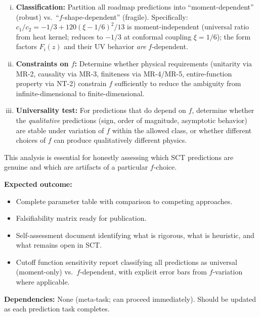 \documentclass[12pt,a4paper]{article}
\newcommand{\outcome}[1]{\noindent\textbf{Expected outcome:} #1\par}
\newcommand{\deps}[1]{\noindent\textbf{Dependencies:} #1\par}
\begin{document}
{\begin{enumerate}[(a)]
\begin{enumerate}[(i)]
        full shape of $f$? The heat-kernel expansion to $a_4$ (Einstein--Hilbert +
        SM Lagrangian) depends only on moments; the nonlocal form factors $F_1$,
        $F_2$ depend on the \emph{entire} function $f$ via the Laplace transform.
      \item \textbf{Classification:} Partition all roadmap predictions into
        ``moment-dependent'' (robust) vs.\ ``$f$-shape-dependent'' (fragile).
        Specifically: $c_1/c_2 = -1/3 + 120(\xi-1/6)^2/13$ is moment-independent
        (universal ratio from heat kernel; reduces to $-1/3$ at conformal coupling
        $\xi = 1/6$); the form factors $F_i(z)$ and their UV behavior
        \emph{are} $f$-dependent.
      \item \textbf{Constraints on $f$:} Determine whether physical requirements
        (unitarity via MR-2, causality via MR-3, finiteness via MR-4/MR-5,
        entire-function property via NT-2) constrain $f$ sufficiently to reduce
        the ambiguity from infinite-dimensional to finite-dimensional.
      \item \textbf{Universality test:} For predictions that do depend on $f$,
        determine whether the \emph{qualitative} predictions (sign, order of
        magnitude, asymptotic behavior) are stable under variation of $f$
        within the allowed class, or whether different choices of $f$ can
        produce qualitatively different physics.
    \end{enumerate}
    This analysis is essential for honestly assessing which SCT predictions
    are genuine and which are artifacts of a particular $f$-choice.
\end{enumerate}
}

\outcome{
\begin{itemize}
  \item Complete parameter table with comparison to competing approaches.
  \item Falsifiability matrix ready for publication.
  \item Self-assessment document identifying what is rigorous, what is
    heuristic, and what remains open in SCT.
  \item Cutoff function sensitivity report classifying all predictions as
    universal (moment-only) vs.\ $f$-dependent, with explicit error bars
    from $f$-variation where applicable.
\end{itemize}
}

\deps{None (meta-task; can proceed immediately). Should be updated
as each prediction task completes.}
\end{document}
